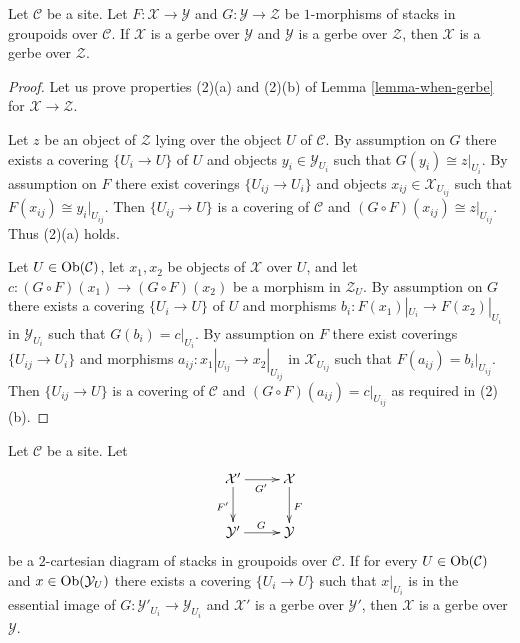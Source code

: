 \begin{lemma}
\label{lemma-composition-gerbe}
Let $\mathcal{C}$ be a site. Let
$F : \mathcal{X} \to \mathcal{Y}$ and $G : \mathcal{Y} \to \mathcal{Z}$
be $1$-morphisms of stacks in groupoids over $\mathcal{C}$.
If $\mathcal{X}$ is a gerbe over $\mathcal{Y}$ and
$\mathcal{Y}$ is a gerbe over $\mathcal{Z}$, then
$\mathcal{X}$ is a gerbe over $\mathcal{Z}$.
\end{lemma}

\begin{proof}
Let us prove properties (2)(a) and (2)(b) of
Lemma \ref{lemma-when-gerbe}
for $\mathcal{X} \to \mathcal{Z}$.

\medskip\noindent
Let $z$ be an object of $\mathcal{Z}$ lying over the object $U$
of $\mathcal{C}$. By assumption on $G$ there exists
a covering $\{U_i \to U\}$ of $U$ and objects
$y_i \in \mathcal{Y}_{U_i}$ such that $G(y_i) \cong z|_{U_i}$.
By assumption on $F$ there exist coverings $\{U_{ij} \to U_i\}$
and objects $x_{ij} \in \mathcal{X}_{U_{ij}}$ such that
$F(x_{ij}) \cong y_i|_{U_{ij}}$.
Then $\{U_{ij} \to U\}$ is a covering of $\mathcal{C}$
and $(G \circ F)(x_{ij}) \cong z|_{U_{ij}}$. Thus (2)(a) holds.

\medskip\noindent
Let $U \in \mathop{\mathrm{Ob}}\nolimits(\mathcal{C})$, let $x_1, x_2$ be objects of
$\mathcal{X}$ over $U$, and let
$c : (G \circ F)(x_1) \to (G \circ F)(x_2)$ be a morphism in
$\mathcal{Z}_U$. By assumption on $G$ there exists
a covering $\{U_i \to U\}$ of $U$ and morphisms
$b_i : F(x_1)|_{U_i} \to F(x_2)|_{U_i}$ in $\mathcal{Y}_{U_i}$
such that $G(b_i) = c|_{U_i}$.
By assumption on $F$ there exist coverings $\{U_{ij} \to U_i\}$
and morphisms $a_{ij} : x_1|_{U_{ij}} \to x_2|_{U_{ij}}$ in
$\mathcal{X}_{U_{ij}}$ such that $F(a_{ij}) = b_i|_{U_{ij}}$.
Then $\{U_{ij} \to U\}$ is a covering of $\mathcal{C}$
and $(G \circ F)(a_{ij}) = c|_{U_{ij}}$ as required in (2)(b).
\end{proof}

\begin{lemma}
\label{lemma-gerbe-descent}
Let $\mathcal{C}$ be a site. Let
$$
\xymatrix{
\mathcal{X}' \ar[r]_{G'} \ar[d]_{F'} & \mathcal{X} \ar[d]^F \\
\mathcal{Y}' \ar[r]^G & \mathcal{Y}
}
$$
be a $2$-cartesian diagram of stacks in groupoids over $\mathcal{C}$.
If for every $U \in \mathop{\mathrm{Ob}}\nolimits(\mathcal{C})$ and
$x \in \mathop{\mathrm{Ob}}\nolimits(\mathcal{Y}_U)$ there exists a covering
$\{U_i \to U\}$ such that $x|_{U_i}$ is in the essential
image of $G : \mathcal{Y}'_{U_i} \to \mathcal{Y}_{U_i}$ and
$\mathcal{X}'$ is a gerbe over $\mathcal{Y}'$, then
$\mathcal{X}$ is a gerbe over $\mathcal{Y}$.
\end{lemma}

